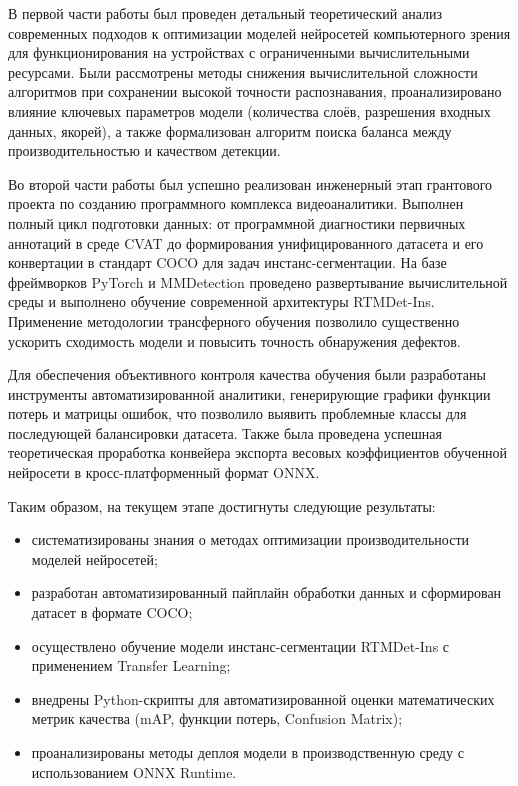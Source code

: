 \documentclass[a4paper,12pt]{article}
\begin{document}
В первой части работы был проведен детальный теоретический анализ современных подходов к оптимизации моделей нейросетей компьютерного зрения для функционирования на устройствах с ограниченными вычислительными ресурсами. Были рассмотрены методы снижения вычислительной сложности алгоритмов при сохранении высокой точности распознавания, проанализировано влияние ключевых параметров модели (количества слоёв, разрешения входных данных, якорей), а также формализован алгоритм поиска баланса между производительностью и качеством детекции. 

Во второй части работы был успешно реализован инженерный этап грантового проекта по созданию программного комплекса видеоаналитики. Выполнен полный цикл подготовки данных: от программной диагностики первичных аннотаций в среде CVAT до формирования унифицированного датасета и его конвертации в стандарт COCO для задач инстанс-сегментации. На базе фреймворков PyTorch и MMDetection проведено развертывание вычислительной среды и выполнено обучение современной архитектуры RTMDet-Ins. Применение методологии трансферного обучения позволило существенно ускорить сходимость модели и повысить точность обнаружения дефектов.

Для обеспечения объективного контроля качества обучения были разработаны инструменты автоматизированной аналитики, генерирующие графики функции потерь и матрицы ошибок, что позволило выявить проблемные классы для последующей балансировки датасета. Также была проведена успешная теоретическая проработка конвейера экспорта весовых коэффициентов обученной нейросети в кросс-платформенный формат ONNX.

Таким образом, на текущем этапе достигнуты следующие результаты:
\begin{itemize}
    \item систематизированы знания о методах оптимизации производительности моделей нейросетей;
    \item разработан автоматизированный пайплайн обработки данных и сформирован датасет в формате COCO;
    \item осуществлено обучение модели инстанс-сегментации RTMDet-Ins с применением Transfer Learning;
    \item внедрены Python-скрипты для автоматизированной оценки математических метрик качества (mAP, функции потерь, Confusion Matrix);
    \item проанализированы методы деплоя модели в производственную среду с использованием ONNX Runtime.
\end{itemize}
\end{document}
